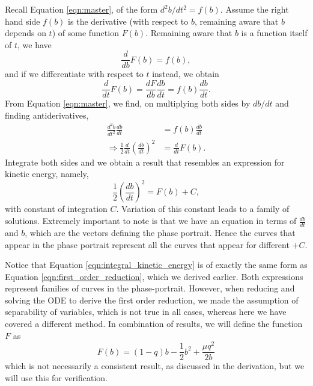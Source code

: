 Recall Equation \ref{eqn:master}, of the form $d^2b/dt^2 = f(b)$.
Assume the right hand side $f(b)$ is the derivative (with respect to $b$, remaining aware that $b$ depends on $t$) of some function $F(b)$.
Remaining aware that $b$ is a function itself of $t$, we have
\begin{equation}
    \frac{d}{db}F(b) = f(b),
\end{equation}
and if we differentiate with respect to $t$ instead, we obtain
\begin{equation}
    \frac{d}{dt}F(b) = \frac{dF}{db}\frac{db}{dt} = f(b)\frac{db}{dt}.
\end{equation}
From Equation \ref{eqn:master}, we find, on multiplying both sides by $db/dt$ and finding antiderivatives,
\begin{align}
    \frac{d^2b}{dt^2} \frac{db}{dt}                                   & = f(b) \frac{db}{dt} \\
    \Rightarrow \frac{1}{2}\frac{d}{dt}\left( \frac{db}{dt} \right)^2 & = \frac{d}{dt}F(b).
\end{align}
Integrate both sides and we obtain a result that resembles an expression for kinetic energy, namely,
\begin{equation}
    \frac{1}{2}\left(\frac{db}{dt}\right)^2 = F(b) + C,
    \label{eqn:integral_kinetic_energy}
\end{equation}
with constant of integration $C$. Variation of this constant leads to a family of solutions.
Extremely important to note is that we have an equation in terms of $\frac{db}{dt}$ and $b$, which are the vectors defining the phase portrait.
Hence the curves that appear in the phase portrait represent all the curves that appear for different $+C$.


Notice that Equation \ref{eqn:integral_kinetic_energy} is of exactly the same form as Equation \ref{eqn:first_order_reduction},
which we derived earlier.
Both expressions represent families of curves in the phase-portrait.
However, when reducing and solving the ODE to derive the first order reduction, we made the assumption of separability of variables,
which is not true in all cases,
whereas here we have covered a different method.
In combination of results, we will define the function $F$ as
\begin{equation}
    F(b) = (1-q)b - \frac{1}{2}b^2 + \frac{\mu q^2}{2b}
    \label{eqn:integral_curve_supposed}
\end{equation}
which is not necessarily a consistent result, as discussed in the derivation, but we will use this for verification.


